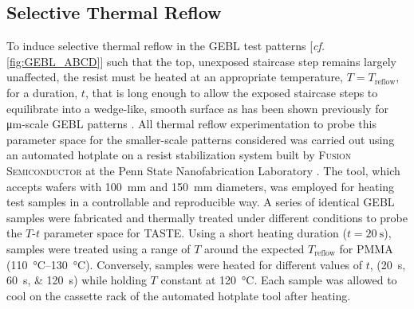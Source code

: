 \subsection{Selective Thermal Reflow}\label{sec:reflow_results} 
To induce selective thermal reflow in the GEBL test patterns [\emph{cf.\@} \cref{fig:GEBL_ABCD}] such that the top, unexposed staircase step remains largely unaffected, the resist must be heated at an appropriate temperature, $T = T_{\text{reflow}}$, for a duration, $t$, that is long enough to allow the exposed staircase steps to equilibrate into a wedge-like, smooth surface as has been shown previously for \si{\um}-scale GEBL patterns \cite{Schleunitz10,Schleunitz11a,Schleunitz14,Kirchner19}. 
All thermal reflow experimentation to probe this parameter space for the smaller-scale patterns considered was carried out using an automated hotplate on a resist stabilization system built by \textsc{Fusion Semiconductor} at the Penn State Nanofabrication Laboratory \cite{PSU_MRI_nanofab}. 
The tool, which accepts wafers with \SI{100}{\mm} and \SI{150}{\mm} diameters, was employed for heating test samples in a controllable and reproducible way. 
A series of identical GEBL samples were fabricated and thermally treated under different conditions to probe the $T$-$t$ parameter space for TASTE. 
Using a short heating duration ($t = \SI{20}{\second}$), samples were treated using a range of $T$ around the expected $T_{\text{reflow}}$ for PMMA (\SIrange{110}{130}{\celsius}). 
Conversely, samples were heated for different values of $t$, (\SIlist{20;60;120}{\second}) while holding $T$ constant at \SI{120}{\celsius}. 
Each sample was allowed to cool on the cassette rack of the automated hotplate tool after heating.

